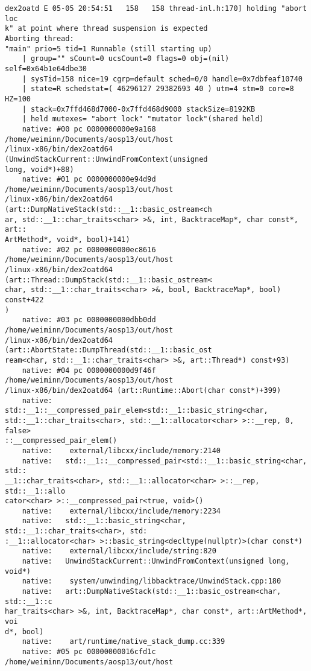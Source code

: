\begin{lstlisting}
dex2oatd E 05-05 20:54:51   158   158 thread-inl.h:170] holding "abort loc
k" at point where thread suspension is expected
Aborting thread:
"main" prio=5 tid=1 Runnable (still starting up)
    | group="" sCount=0 ucsCount=0 flags=0 obj=(nil) self=0x64b1e64dbe30
    | sysTid=158 nice=19 cgrp=default sched=0/0 handle=0x7dbfeaf10740
    | state=R schedstat=( 46296127 29382693 40 ) utm=4 stm=0 core=8 HZ=100
    | stack=0x7ffd468d7000-0x7ffd468d9000 stackSize=8192KB
    | held mutexes= "abort lock" "mutator lock"(shared held)
    native: #00 pc 0000000000e9a168  /home/weiminn/Documents/aosp13/out/host
/linux-x86/bin/dex2oatd64 (UnwindStackCurrent::UnwindFromContext(unsigned 
long, void*)+88)
    native: #01 pc 0000000000e94d9d  /home/weiminn/Documents/aosp13/out/host
/linux-x86/bin/dex2oatd64 (art::DumpNativeStack(std::__1::basic_ostream<ch
ar, std::__1::char_traits<char> >&, int, BacktraceMap*, char const*, art::
ArtMethod*, void*, bool)+141)
    native: #02 pc 0000000000ec8616  /home/weiminn/Documents/aosp13/out/host
/linux-x86/bin/dex2oatd64 (art::Thread::DumpStack(std::__1::basic_ostream<
char, std::__1::char_traits<char> >&, bool, BacktraceMap*, bool) const+422
)
    native: #03 pc 0000000000dbb0dd  /home/weiminn/Documents/aosp13/out/host
/linux-x86/bin/dex2oatd64 (art::AbortState::DumpThread(std::__1::basic_ost
ream<char, std::__1::char_traits<char> >&, art::Thread*) const+93)
    native: #04 pc 0000000000d9f46f  /home/weiminn/Documents/aosp13/out/host
/linux-x86/bin/dex2oatd64 (art::Runtime::Abort(char const*)+399)
    native:   std::__1::__compressed_pair_elem<std::__1::basic_string<char, 
std::__1::char_traits<char>, std::__1::allocator<char> >::__rep, 0, false>
::__compressed_pair_elem()
    native:    external/libcxx/include/memory:2140
    native:   std::__1::__compressed_pair<std::__1::basic_string<char, std::
__1::char_traits<char>, std::__1::allocator<char> >::__rep, std::__1::allo
cator<char> >::__compressed_pair<true, void>()
    native:    external/libcxx/include/memory:2234
    native:   std::__1::basic_string<char, std::__1::char_traits<char>, std:
:__1::allocator<char> >::basic_string<decltype(nullptr)>(char const*)
    native:    external/libcxx/include/string:820
    native:   UnwindStackCurrent::UnwindFromContext(unsigned long, void*)
    native:    system/unwinding/libbacktrace/UnwindStack.cpp:180
    native:   art::DumpNativeStack(std::__1::basic_ostream<char, std::__1::c
har_traits<char> >&, int, BacktraceMap*, char const*, art::ArtMethod*, voi
d*, bool)
    native:    art/runtime/native_stack_dump.cc:339
    native: #05 pc 00000000016cfd1c  /home/weiminn/Documents/aosp13/out/host

\end{lstlisting}
